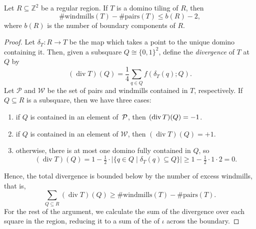 \begin{theorem}\label{thm:main}
  Let $R \subseteq \mathbb{Z}^2$ be a regular region. If $T$ is a domino tiling of $R$, then
  \begin{equation}
    \# \mathrm{windmills}(T) - \# \mathrm{pairs}(T) \leq b(R) - 2,
  \end{equation}
  where $b(R)$ is the number of boundary components of $R$.
\end{theorem}
\begin{proof}
  Let $\delta_T \colon R \to T$ be the map which takes a point to the unique domino containing it. Then, given a subsquare $Q \cong \{0,1\}^2$, define the \emph{divergence} of $T$ at $Q$ by
  \begin{equation}
    (\operatorname{div} T)(Q) = \frac{1}{4}\sum_{q \in Q} f(\delta_T(q); Q).
  \end{equation}
  Let $\mathcal{P}$ and $\mathcal{W}$ be the set of pairs and windmills contained in $T$, respectively. If $Q \subseteq R$ is a subsquare, then we have three cases:
  \begin{enumerate}
    \item if $Q$ is contained in an element of $\mskip 3mu \mathcal{P}$, then $\mskip 2mu (\operatorname{div} T) (Q) = -1$.
    \item if $Q$ is contained in an element of $\mathcal{W}$, then $(\operatorname{div} T) (Q) = +1$.
    \item otherwise, there is at most one domino fully contained in $Q$, so 
    \begin{equation}
      (\operatorname{div} T) (Q) = 1 - \tfrac{1}{2} \cdot|\{q \in Q \mid \delta_T(q) \subseteq Q \}| \geq 1 - \tfrac{1}{2} \cdot 1 \cdot  2 = 0.
    \end{equation}
  \end{enumerate}
  Hence, the total divergence is bounded below by the number of excess windmills, that is,
  \begin{equation}
    \sum_{Q \subseteq R} (\operatorname{div} T) (Q) \geq \#\text{windmills}(T) - \#\text{pairs}(T).
  \end{equation}
  For the rest of the argument, we calculate the sum of the divergence over each square in the region, reducing it to a sum of the  of $\iota$ across the boundary.


\end{proof}
